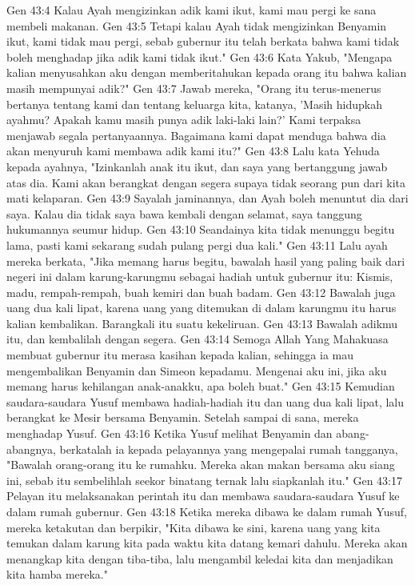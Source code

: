 Gen 43:4  Kalau Ayah mengizinkan adik kami ikut, kami mau pergi ke sana membeli makanan.
Gen 43:5  Tetapi kalau Ayah tidak mengizinkan Benyamin ikut, kami tidak mau pergi, sebab gubernur itu telah berkata bahwa kami tidak boleh menghadap jika adik kami tidak ikut."
Gen 43:6  Kata Yakub, "Mengapa kalian menyusahkan aku dengan memberitahukan kepada orang itu bahwa kalian masih mempunyai adik?"
Gen 43:7  Jawab mereka, "Orang itu terus-menerus bertanya tentang kami dan tentang keluarga kita, katanya, 'Masih hidupkah ayahmu? Apakah kamu masih punya adik laki-laki lain?' Kami terpaksa menjawab segala pertanyaannya. Bagaimana kami dapat menduga bahwa dia akan menyuruh kami membawa adik kami itu?"
Gen 43:8  Lalu kata Yehuda kepada ayahnya, "Izinkanlah anak itu ikut, dan saya yang bertanggung jawab atas dia. Kami akan berangkat dengan segera supaya tidak seorang pun dari kita mati kelaparan.
Gen 43:9  Sayalah jaminannya, dan Ayah boleh menuntut dia dari saya. Kalau dia tidak saya bawa kembali dengan selamat, saya tanggung hukumannya seumur hidup.
Gen 43:10  Seandainya kita tidak menunggu begitu lama, pasti kami sekarang sudah pulang pergi dua kali."
Gen 43:11  Lalu ayah mereka berkata, "Jika memang harus begitu, bawalah hasil yang paling baik dari negeri ini dalam karung-karungmu sebagai hadiah untuk gubernur itu: Kismis, madu, rempah-rempah, buah kemiri dan buah badam.
Gen 43:12  Bawalah juga uang dua kali lipat, karena uang yang ditemukan di dalam karungmu itu harus kalian kembalikan. Barangkali itu suatu kekeliruan.
Gen 43:13  Bawalah adikmu itu, dan kembalilah dengan segera.
Gen 43:14  Semoga Allah Yang Mahakuasa membuat gubernur itu merasa kasihan kepada kalian, sehingga ia mau mengembalikan Benyamin dan Simeon kepadamu. Mengenai aku ini, jika aku memang harus kehilangan anak-anakku, apa boleh buat."
Gen 43:15  Kemudian saudara-saudara Yusuf membawa hadiah-hadiah itu dan uang dua kali lipat, lalu berangkat ke Mesir bersama Benyamin. Setelah sampai di sana, mereka menghadap Yusuf.
Gen 43:16  Ketika Yusuf melihat Benyamin dan abang-abangnya, berkatalah ia kepada pelayannya yang mengepalai rumah tangganya, "Bawalah orang-orang itu ke rumahku. Mereka akan makan bersama aku siang ini, sebab itu sembelihlah seekor binatang ternak lalu siapkanlah itu."
Gen 43:17  Pelayan itu melaksanakan perintah itu dan membawa saudara-saudara Yusuf ke dalam rumah gubernur.
Gen 43:18  Ketika mereka dibawa ke dalam rumah Yusuf, mereka ketakutan dan berpikir, "Kita dibawa ke sini, karena uang yang kita temukan dalam karung kita pada waktu kita datang kemari dahulu. Mereka akan menangkap kita dengan tiba-tiba, lalu mengambil keledai kita dan menjadikan kita hamba mereka."
